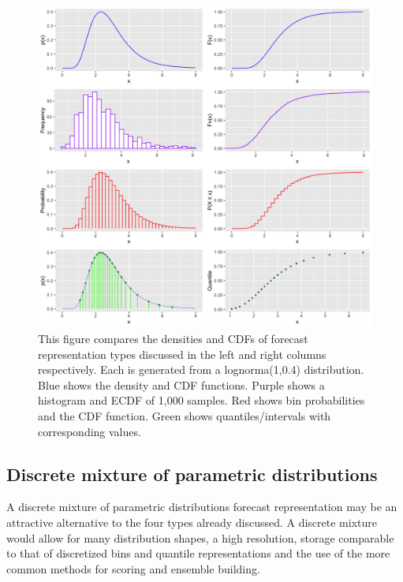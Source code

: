 \documentclass[11pt,notitlepage]{isuthesis}
\begin{document}
\begin{figure}[htbp]
\centerline{\includegraphics[scale=.1]{Images/dens_cum_comp.png}}
\caption[Density/CDF comparison between parametric distribution, sample 
distribution, discretized bin distribution and quantiles]{This figure compares 
the
densities and CDFs of forecast representation types discussed in the left and 
right columns respectively. Each is generated from a lognorma(1,0.4) 
distribution. Blue shows the density and CDF functions. Purple shows a 
histogram and ECDF of 1,000 samples. Red shows bin probabilities and the CDF
function. Green shows quantiles/intervals with corresponding values.}
\label{fig:denscomp}
\end{figure}




\subsection{Discrete mixture of parametric distributions}
A discrete mixture of parametric distributions forecast representation may be an
attractive alternative to the four types already discussed. A discrete mixture 
would allow for many distribution shapes, a high resolution, storage comparable
to that of discretized bins and quantile representations and the use of the more
common methods for scoring and ensemble building.
\end{document}
